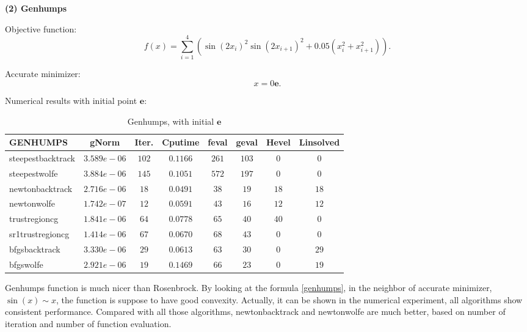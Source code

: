 \documentclass[11pt]{report}
\begin{document}
\textbf{(2) Genhumps }

Objective function: 
\begin{equation}\label{genhumps}
    f(x) = \sum_{i=1}^4(\sin(2x_i)^2\sin(2x_{i+1})^2+0.05(x_i^2+x_{i+1}^2)).
\end{equation}

Accurate minimizer:
\begin{equation}
    x = 0\mathbf{e}  .
\end{equation}

Numerical results with initial point $\mathbf{e}$:
\begin{table}[H]
    \caption{Genhumps, with initial $\mathbf{e}$}
    \label{tab:Genhumps_initial}
    \begin{center}
        \begin{tabular}{l|ccccccc}
\textbf{GENHUMPS}&  gNorm       &   Iter.  &   Cputime   &   feval&geval&Hevel&Linsolved\\
\hline
steepestbacktrack   &   $3.589e-06 $&   $102  $&   $0.1166  $&$261  $&$103  $&$0    $&$0    $       \\
steepestwolfe       &   $3.884e-06 $&   $145  $&   $0.1051  $&$572  $&$197  $&$0    $&$0    $       \\
newtonbacktrack     &   $2.716e-06 $&   $18   $&   $0.0491  $&$38   $&$19   $&$18   $&$18   $       \\
newtonwolfe         &   $1.742e-07 $&   $12   $&   $0.0591  $&$43   $&$16   $&$12   $&$12   $       \\
trustregioncg       &   $1.841e-06 $&   $64   $&   $0.0778  $&$65   $&$40   $&$40    $&$0    $       \\
sr1trustregioncg    &   $1.414e-06 $&   $67   $&   $0.0670  $&$68   $&$43   $&$0    $&$0    $       \\
bfgsbacktrack       &   $3.330e-06 $&   $29   $&   $0.0613  $&$63   $&$30   $&$0    $&$29   $       \\
bfgswolfe           &   $2.921e-06 $&   $19   $&   $0.1469  $&$66   $&$23   $&$0    $&$19   $       \\
 \end{tabular}
    \end{center}
\end{table}

Genhumps function is much nicer than Rosenbrock. By looking at the formula \eqref{genhumps}, in the neighbor of accurate minimizer, $\sin(x)\sim x$, the function is suppose to have good convexity. Actually, it can be shown in the numerical experiment, all algorithms show consistent performance. Compared with all those algorithms, newtonbacktrack and newtonwolfe are much better, based on number of iteration and number of function evaluation.
\end{document}
